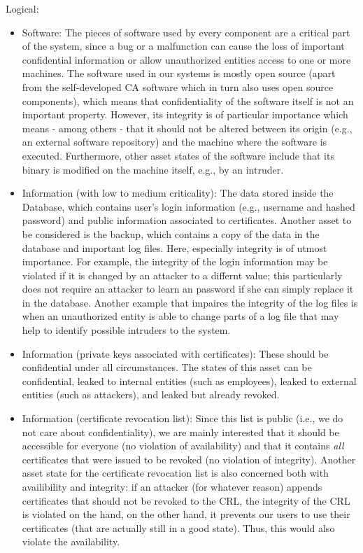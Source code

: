 \documentclass[english]{article}
\begin{document}
	Logical:
	\begin{itemize}
    \item Software: The pieces of software used by every component are a critical part of the system, since a bug or a malfunction can cause the loss of important confidential information or allow unauthorized entities access to one or more machines. The software used in our systems is mostly open source (apart from the self-developed CA software which in turn also uses open source components), which means that confidentiality of the software itself is not an important property. However, its integrity is of particular importance which means - among others - that it should not be altered between its origin (e.g., an external software repository) and the machine where the software is executed. Furthermore, other asset states of the software include that its binary is modified on the machine itself, e.g., by an intruder.
    \item Information (with low to medium criticality): The data stored inside the Database, which contains user's login information (e.g., username and hashed password) and public information associated to certificates. Another asset to be considered is the backup, which contains a copy of the data in the database and important log files. Here, especially integrity is of utmost importance. For example, the integrity of the login information may be violated if it is changed by an attacker to a differnt value; this particularly does not require an attacker to learn an password if she can simply replace it in the database. Another example that impaires the integrity of the log files is when an unauthorized entity is able to change parts of a log file that may help to identify possible intruders to the system.
    \item Information (private keys associated with certificates): These should be confidential under all circumstances. The states of this asset can be confidential, leaked to internal entities (such as employees), leaked to external entities (such as attackers), and leaked but already revoked.
    \item Information (certificate revocation list): Since this list is public (i.e., we do not care about confidentiality), we are mainly interested that it should be accessible for everyone (no violation of availability) and that it contains \textit{all} certificates that were issued to be revoked (no violation of integrity). Another asset state for the certificate revocation list is also concerned both with availibility and integrity: if an attacker (for whatever reason) appends certificates that should not be revoked to the CRL, the integrity of the CRL is violated on the hand, on the other hand, it prevents our users to use their certificates (that are actually still in a good state). Thus, this would also violate the availability.

\end{itemize}
\end{document}
